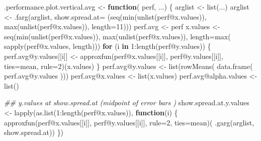 \documentclass[
  letterpaper,
  DIV=11,
  numbers=noendperiod]{scrartcl}
\newenvironment{Shaded}{\begin{snugshade}}{\end{snugshade}}
\newcommand{\AttributeTok}[1]{\textcolor[rgb]{0.40,0.45,0.13}{#1}}
\newcommand{\ControlFlowTok}[1]{\textcolor[rgb]{0.00,0.23,0.31}{\textbf{#1}}}
\newcommand{\DecValTok}[1]{\textcolor[rgb]{0.68,0.00,0.00}{#1}}
\newcommand{\DocumentationTok}[1]{\textcolor[rgb]{0.37,0.37,0.37}{\textit{#1}}}
\newcommand{\FunctionTok}[1]{\textcolor[rgb]{0.28,0.35,0.67}{#1}}
\newcommand{\NormalTok}[1]{\textcolor[rgb]{0.00,0.23,0.31}{#1}}
\newcommand{\OtherTok}[1]{\textcolor[rgb]{0.00,0.23,0.31}{#1}}
\newcommand{\SpecialCharTok}[1]{\textcolor[rgb]{0.37,0.37,0.37}{#1}}
\newcommand{\StringTok}[1]{\textcolor[rgb]{0.13,0.47,0.30}{#1}}
\begin{document}
\begin{Shaded}
\begin{Highlighting}[]
\NormalTok{.performance.plot.vertical.avg }\OtherTok{\textless{}{-}} \ControlFlowTok{function}\NormalTok{( perf, ...) \{}
\NormalTok{    arglist }\OtherTok{\textless{}{-}} \FunctionTok{list}\NormalTok{(...)}
\NormalTok{    arglist }\OtherTok{\textless{}{-}} \FunctionTok{.farg}\NormalTok{(arglist,}
                     \AttributeTok{show.spread.at=}\NormalTok{ (}\FunctionTok{seq}\NormalTok{(}\FunctionTok{min}\NormalTok{(}\FunctionTok{unlist}\NormalTok{(perf}\SpecialCharTok{@}\NormalTok{x.values)),}
                                          \FunctionTok{max}\NormalTok{(}\FunctionTok{unlist}\NormalTok{(perf}\SpecialCharTok{@}\NormalTok{x.values)),}
                                          \AttributeTok{length=}\DecValTok{11}\NormalTok{)))}
\NormalTok{    perf.avg }\OtherTok{\textless{}{-}}\NormalTok{ perf}
\NormalTok{    x.values }\OtherTok{\textless{}{-}} \FunctionTok{seq}\NormalTok{(}\FunctionTok{min}\NormalTok{(}\FunctionTok{unlist}\NormalTok{(perf}\SpecialCharTok{@}\NormalTok{x.values)), }\FunctionTok{max}\NormalTok{(}\FunctionTok{unlist}\NormalTok{(perf}\SpecialCharTok{@}\NormalTok{x.values)),}
                    \AttributeTok{length=}\FunctionTok{max}\NormalTok{( }\FunctionTok{sapply}\NormalTok{(perf}\SpecialCharTok{@}\NormalTok{x.values, length)))}
    \ControlFlowTok{for}\NormalTok{ (i }\ControlFlowTok{in} \DecValTok{1}\SpecialCharTok{:}\FunctionTok{length}\NormalTok{(perf}\SpecialCharTok{@}\NormalTok{y.values)) \{}
\NormalTok{        perf.avg}\SpecialCharTok{@}\NormalTok{y.values[[i]] }\OtherTok{\textless{}{-}}
          \FunctionTok{approxfun}\NormalTok{(perf}\SpecialCharTok{@}\NormalTok{x.values[[i]], perf}\SpecialCharTok{@}\NormalTok{y.values[[i]],}
                    \AttributeTok{ties=}\NormalTok{mean, }\AttributeTok{rule=}\DecValTok{2}\NormalTok{)(x.values)}
\NormalTok{    \}}
\NormalTok{    perf.avg}\SpecialCharTok{@}\NormalTok{y.values }\OtherTok{\textless{}{-}} \FunctionTok{list}\NormalTok{(}\FunctionTok{rowMeans}\NormalTok{( }\FunctionTok{data.frame}\NormalTok{( perf.avg}\SpecialCharTok{@}\NormalTok{y.values )))}
\NormalTok{    perf.avg}\SpecialCharTok{@}\NormalTok{x.values }\OtherTok{\textless{}{-}} \FunctionTok{list}\NormalTok{(x.values)}
\NormalTok{    perf.avg}\SpecialCharTok{@}\NormalTok{alpha.values }\OtherTok{\textless{}{-}} \FunctionTok{list}\NormalTok{()}

    \DocumentationTok{\#\# y.values at show.spread.at (midpoint of error bars )}
\NormalTok{    show.spread.at.y.values }\OtherTok{\textless{}{-}}
      \FunctionTok{lapply}\NormalTok{(}\FunctionTok{as.list}\NormalTok{(}\DecValTok{1}\SpecialCharTok{:}\FunctionTok{length}\NormalTok{(perf}\SpecialCharTok{@}\NormalTok{x.values)),}
             \ControlFlowTok{function}\NormalTok{(i) \{}
                 \FunctionTok{approxfun}\NormalTok{(perf}\SpecialCharTok{@}\NormalTok{x.values[[i]], perf}\SpecialCharTok{@}\NormalTok{y.values[[i]],}
                           \AttributeTok{rule=}\DecValTok{2}\NormalTok{,}
                           \AttributeTok{ties=}\NormalTok{mean)( }\FunctionTok{.garg}\NormalTok{(arglist, }\StringTok{\textquotesingle{}show.spread.at\textquotesingle{}}\NormalTok{))}
\NormalTok{             \})}


\end{Highlighting}
\end{Shaded}
\end{document}
